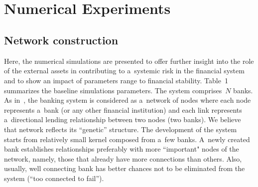 \begin{multicols}{2}
    \begin{figure*}[b] %
    \vspace*{1pt}
    \begin{minipage}[t]{80mm}
\begin{center}
\mbox{%
\epsfxsize=77.973mm
}
\end{center}
\vspace*{-9pt}
        \label{fig:1}
        \end{minipage}
        \hfill
    \vspace*{1pt}
    \begin{minipage}[t]{80mm}
\begin{center}
\mbox{%
\epsfxsize=78.228mm
}
\end{center}
\vspace*{-9pt}
        \label{fig:2}
                \end{minipage}
            \end{figure*}   
            
            \vspace*{-6pt}         

\section{Numerical Experiments}

            \vspace*{-6pt}


\subsection{Network construction}

            \vspace*{-4pt}

\noindent
Here, the  numerical simulations are presented to offer further insight into the role of 
the external assets in contributing to a~systemic risk in the financial system 
and to show an impact of  parameters  range to financial stability.
Table~1 summarizes the baseline simulations parameters. The system comprises~$N$ 
banks. As in~\cite{Eboli},  the  banking system is considered as 
a~network of nodes where each node represents a~bank (or any other financial 
institution) and each link represents a~directional lending relationship between 
two nodes (two banks). 
We believe that network reflects its ``genetic'' structure. The development of the 
system starts from relatively small kernel composed from a~few banks. A~newly 
created bank establishes relationships  preferably with more ``important" 
nodes of the network, namely, those that already have more connections  than 
others. Also, usually, well connecting bank 
 has better chances not to be eliminated from the system (``too 
connected to fail''). 


\end{multicols}
